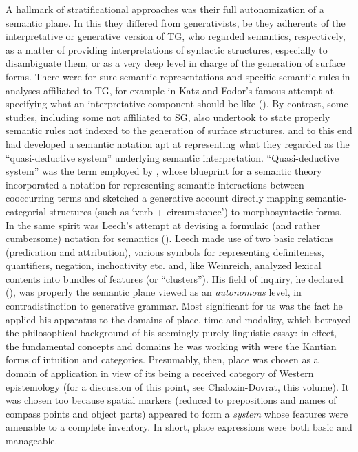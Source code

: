 \documentclass[english,output=paper,colorlinks,citecolor=brown]{../langscibook}
\begin{document}
A hallmark of stratificational approaches was their full autonomization of a semantic plane. In this they differed from generativists, be they adherents of the interpretative or generative version of TG, who regarded semantics, respectively, as a matter of providing interpretations of syntactic structures, especially to disambiguate them, or as a very deep level in charge of the generation of surface forms. There were for sure semantic representations and specific semantic rules in analyses affiliated to TG, for example in Katz and Fodor’s famous attempt at specifying what an interpretative component should be like (\citealt{KatzFodor1963}). By contrast, some studies, including some not affiliated to SG, also undertook to state properly semantic rules not indexed to the generation of surface structures, and to this end had developed a semantic notation apt at representing what they regarded as the “quasi-deductive system” underlying semantic interpretation. “Quasi-deductive system” was the term employed by \citet[163]{Weinreich1972}, whose blueprint for a semantic theory incorporated a notation for representing semantic interactions between cooccurring terms and sketched a generative account directly mapping semantic-categorial structures (such as ‘verb + circumstance’) to morphosyntactic forms. In the same spirit was Leech’s attempt at devising a formulaic (and rather cumbersome) notation for semantics (\citeyear{Leech1969}). Leech made use of two basic relations (predication and attribution), various symbols for representing definiteness, quantifiers, negation, inchoativity etc. and, like Weinreich, analyzed lexical contents into bundles of features (or “clusters”). His field of inquiry, he declared (\citeyear[28--30]{Leech1969}), was properly the semantic plane viewed as an \textit{autonomous} level, in contradistinction to generative grammar. Most significant for us was the fact he applied his apparatus to the domains of place, time and modality, which betrayed the philosophical background of his seemingly purely linguistic essay: in effect, the fundamental concepts and domains he was working with were the Kantian forms of intuition and categories. Presumably, then, place was chosen as a domain of application in view of its being a received category of Western epistemology (for a discussion of this point, see Chalozin-Dovrat, this volume). It was chosen too because spatial markers (reduced to prepositions and names of compass points and object parts) appeared to form a \textit{system} whose features were amenable to a complete inventory. In short, place expressions were both basic and manageable.
\end{document}
